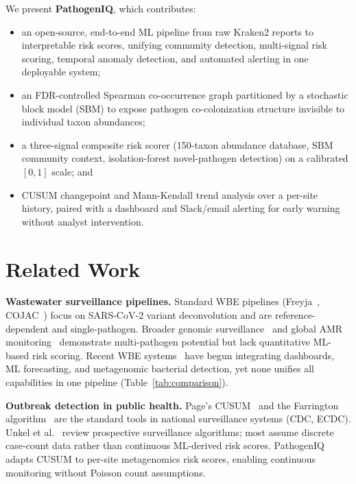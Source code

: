 \documentclass[conference]{IEEEtran}
\begin{document}
We present \textbf{PathogenIQ}, which contributes:
\begin{itemize}
  \item an open-source, end-to-end ML pipeline from raw Kraken2 reports to
    interpretable risk scores, unifying community detection, multi-signal
    risk scoring, temporal anomaly detection, and automated alerting in one
    deployable system;
  \item an FDR-controlled Spearman co-occurrence graph partitioned by a
    stochastic block model (SBM) to expose pathogen co-colonization
    structure invisible to individual taxon abundances;
  \item a three-signal composite risk scorer (150-taxon abundance database,
    SBM community context, isolation-forest novel-pathogen detection) on a
    calibrated $[0,1]$ scale; and
  \item CUSUM changepoint and Mann-Kendall trend analysis over a per-site
    history, paired with a dashboard and Slack/email alerting for early
    warning without analyst intervention.
\end{itemize}

\section{Related Work}

\textbf{Wastewater surveillance pipelines.}
Standard WBE pipelines (Freyja~\cite{Karthikeyan2022}, COJAC~\cite{Jahn2022})
focus on SARS-CoV-2 variant deconvolution and are reference-dependent and
single-pathogen. Broader genomic surveillance~\cite{CritsChristoph2021,Ahmed2020}
and global AMR monitoring~\cite{Hendriksen2019} demonstrate multi-pathogen
potential but lack quantitative ML-based risk scoring.
Recent WBE systems~\cite{Msomi2025,Gauthier2025,Kohle2024,Feistel2025,Pagsuyoin2025}
have begun integrating dashboards, ML forecasting, and metagenomic
bacterial detection, yet none unifies all capabilities in one pipeline
(Table~\ref{tab:comparison}).

\textbf{Outbreak detection in public health.}
Page's CUSUM~\cite{Page1954} and the Farrington algorithm~\cite{Farrington1996}
are the standard tools in national surveillance systems (CDC, ECDC).
Unkel et al.~\cite{Unkel2012} review prospective surveillance algorithms;
most assume discrete case-count data rather than continuous ML-derived
risk scores. PathogenIQ adapts CUSUM to per-site metagenomics risk scores,
enabling continuous monitoring without Poisson count assumptions.
\end{document}
